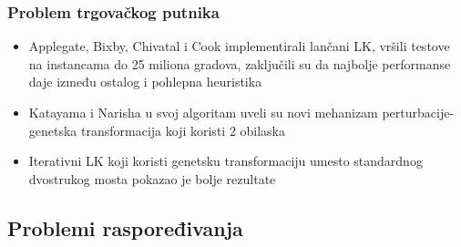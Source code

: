 \documentclass{beamer}
\begin{document}
\begin{frame}[fragile]\frametitle{Problem trgovačkog putnika}
\begin{itemize}
  \item Applegate, Bixby, Chivatal i Cook implementirali lančani LK, vršili testove na instancama do 25 miliona gradova, zaključili su da najbolje performanse daje između ostalog i pohlepna heuristika
  \item Katayama i Narisha u svoj algoritam uveli su novi mehanizam perturbacije-genetska transformacija koji koristi 2 obilaska
  \item Iterativni LK koji koristi genetsku transformaciju umesto standardnog dvostrukog mosta pokazao je bolje rezultate
\end{itemize}
\end{frame}

\subsection{Problemi raspoređivanja}
\end{document}
